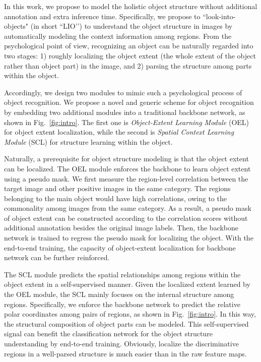 \documentclass[10pt,twocolumn,letterpaper]{article}
\begin{document}
In this work, we propose to model the holistic object structure without additional annotation and extra inference time. Specifically, we propose to ``look-into-objects" (in short ``LIO’’) to understand the object structure in images by automatically modeling the context information among regions. From the psychological point of view, recognizing an object can be naturally regarded into two stages: 1) roughly localizing the object extent (the whole extent of the object rather than object part) in the image, and 2) parsing the structure among parts within the object.

Accordingly, we design two modules to mimic such a psychological process of object recognition. We propose a novel and generic scheme for object recognition by embedding two additional modules into a traditional backbone network, as shown in Fig.~\ref{fig:intro}. The first one is \textit{Object-Extent Learning Module} (OEL) for object extent localization, while the second is \textit{Spatial Context Learning Module} (SCL) for structure learning within the object.

Naturally, a prerequisite for object structure modeling is that the object extent can be localized. The OEL module enforces the backbone to learn object extent using a pseudo mask. We first measure the region-level correlation between the target image and other positive images in the same category. The regions belonging to the main object would have high correlations, owing to the commonality among images from the same category. As a result, a pseudo mask of object extent can be constructed according to the correlation scores without additional annotation besides the original image labels. Then, the backbone network is trained to regress the pseudo mask for localizing the object. With the end-to-end training, the capacity of object-extent localization for backbone network can be further reinforced.


The SCL module predicts the spatial relationships among regions within the object extent in a self-supervised manner. Given the localized extent learned by the OEL module, the SCL mainly focuses on the internal structure among regions. Specifically, we enforce the backbone network to predict the relative polar coordinates among pairs of regions, as shown in Fig.~\ref{fig:intro}. In this way, the structural composition of object parts can be modeled. This self-supervised signal can benefit the classification network for the object structure understanding by end-to-end training. Obviously, localize the discriminative regions in a well-parsed structure is much easier than in the raw feature maps.
\end{document}
